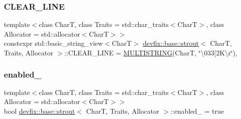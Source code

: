 \mbox{\label{structdevfix_1_1base_1_1strout_afe9d2f4264b508fd02be4af24dba6bb1}} 
\subsubsection{\texorpdfstring{C\+L\+E\+A\+R\+\_\+\+L\+I\+NE}{CLEAR\_LINE}}
{\footnotesize\ttfamily template$<$class CharT, class Traits = std\+::char\+\_\+traits$<$\+Char\+T$>$, class Allocator = std\+::allocator$<$\+Char\+T$>$$>$ \\
constexpr std\+::basic\+\_\+string\+\_\+view$<$CharT$>$ \hyperlink{structdevfix_1_1base_1_1strout}{devfix\+::base\+::strout}$<$ CharT, Traits, Allocator $>$\+::C\+L\+E\+A\+R\+\_\+\+L\+I\+NE = \hyperlink{strutil_8h_a72f64e8a28f366adf3cad6c109082271}{M\+U\+L\+T\+I\+S\+T\+R\+I\+NG}(CharT, \char`\"{}\textbackslash{}033\mbox{[}2\+K\textbackslash{}r\char`\"{})\hspace{0.3cm}{\ttfamily [static]}, {\ttfamily [protected]}}

\mbox{\label{structdevfix_1_1base_1_1strout_a813fc6630d6565cf5a00e620b536671c}} 
\subsubsection{\texorpdfstring{enabled\+\_\+}{enabled\_}}
{\footnotesize\ttfamily template$<$class CharT, class Traits = std\+::char\+\_\+traits$<$\+Char\+T$>$, class Allocator = std\+::allocator$<$\+Char\+T$>$$>$ \\
bool \hyperlink{structdevfix_1_1base_1_1strout}{devfix\+::base\+::strout}$<$ CharT, Traits, Allocator $>$\+::enabled\+\_\+ = true\hspace{0.3cm}{\ttfamily [protected]}}

\mbox{\label{structdevfix_1_1base_1_1strout_aa92f98e253e448a0ea897760764486e7}} 
